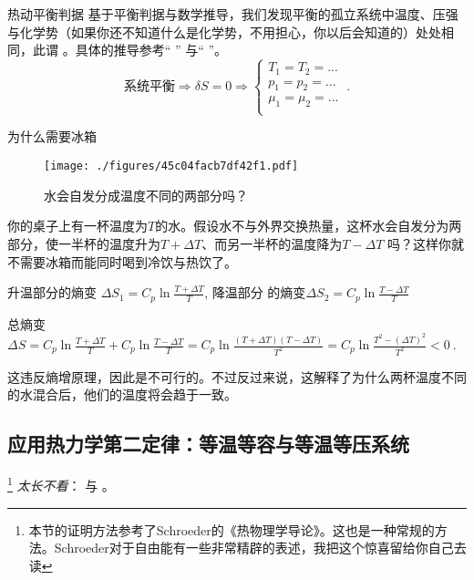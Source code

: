 \begin{theorem}{热动平衡判据}
基于平衡判据与数学推导，我们发现平衡的孤立系统中温度、压强与化学势（如果你还不知道什么是化学势，不用担心，你以后会知道的）处处相同，此谓 。具体的推导参考“ ” 与“ ”。
$$
\text{系统平衡} \Rightarrow \delta S = 0 \Rightarrow 
\left \{
\begin{aligned}
T_1 = T_2 = ...\\
p_1 = p_2 = ...\\
\mu_1 = \mu_2 = ...\\
\end{aligned}
\right.
~.
$$

\end{theorem}

\begin{example}{为什么需要冰箱}
\begin{figure}[ht]
\centering
\texttt{[image: ./figures/45c04facb7df42f1.pdf]}
\caption{水会自发分成温度不同的两部分吗？} \label{fig_Td2Law_5}
\end{figure}
你的桌子上有一杯温度为$T$的水。假设水不与外界交换热量，这杯水会自发分为两部分，使一半杯的温度升为$T+\Delta T$、而另一半杯的温度降为$T-\Delta T$ 吗？这样你就不需要冰箱而能同时喝到冷饮与热饮了。

升温部分的熵变 $\Delta S_1=C_p \ln \frac{T+\Delta T}{T}$, 降温部分 的熵变$\Delta S_2=C_p \ln \frac{T-\Delta T}{T}$

总熵变 $\Delta S = C_p \ln \frac{T+\Delta T}{T} + C_p \ln \frac{T-\Delta T}{T} = C_p \ln \frac{(T+\Delta T)(T-\Delta T)}{T^2}= C_p \ln \frac{T^2 - (\Delta T)^2}{T^2}<0~.$

这违反熵增原理，因此是不可行的。不过反过来说，这解释了为什么两杯温度不同的水混合后，他们的温度将会趋于一致。

\end{example}

\subsection{应用热力学第二定律：等温等容与等温等压系统}
\footnote{本节的证明方法参考了Schroeder的《热物理学导论》。这也是一种常规的方法。Schroeder对于自由能有一些非常精辟的表述，我把这个惊喜留给你自己去读} 
\textsl{太长不看}： 与 。


